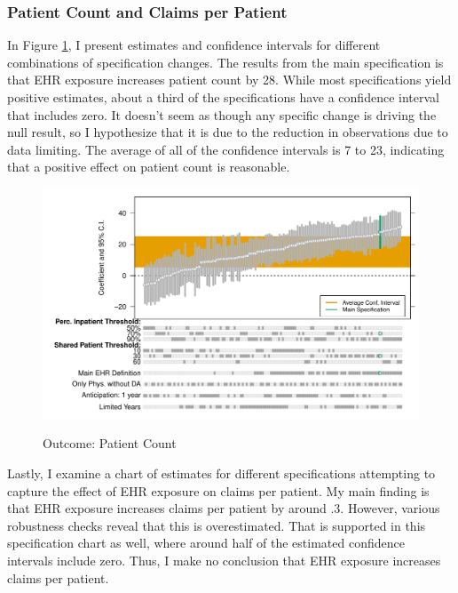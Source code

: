 \documentclass[12pt]{article}
\begin{document}
\subsubsection{Patient Count and Claims per Patient}

In Figure \ref{fig:pat_chart}, I present estimates and confidence intervals for different combinations of specification changes. The results from the main specification is that EHR exposure increases patient count by 28. While most specifications yield positive estimates, about a third of the specifications have a confidence interval that includes zero. It doesn't seem as though any specific change is driving the null result, so I hypothesize that it is due to the reduction in observations due to data limiting. The average of all of the confidence intervals is 7 to 23, indicating that a positive effect on patient count is reasonable. 

\begin{figure}[ht]
    \centering
    \caption{Outcome: Patient Count}
    \includegraphics[scale=.6]{Objects/patient_chart.pdf}
    \label{fig:pat_chart}
\end{figure}

Lastly, I examine a chart of estimates for different specifications attempting to capture the effect of EHR exposure on claims per patient. My main finding is that EHR exposure increases claims per patient by around .3. However, various robustness checks reveal that this is overestimated. That is supported in this specification chart as well, where around half of the estimated confidence intervals include zero. Thus, I make no conclusion that EHR exposure increases claims per patient. 
\end{document}

